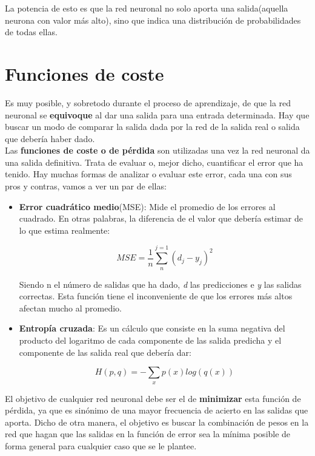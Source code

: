 \documentclass[11pt,fleqn]{book} %
\begin{document}
La potencia de esto es que la red neuronal no solo aporta una salida(aquella neurona con valor más alto), sino que indica una distribución de probabilidades de todas ellas. 

\section{Funciones de coste}\label{sec:funcioncoste} 

Es muy posible, y sobretodo durante el proceso de aprendizaje, de que la red neuronal se \textbf{equivoque} al dar una salida para una entrada determinada. Hay que buscar un modo de comparar la salida dada por la red de la salida real o salida que debería haber dado. \\

Las \textbf{funciones de coste o de pérdida} son utilizadas una vez la red neuronal da una salida definitiva. Trata de evaluar o, mejor dicho, cuantificar el error que ha tenido. Hay muchas formas de analizar o evaluar este error, cada una con sus pros y contras, vamos a ver un par de ellas:\\

\begin{itemize}
	\item \textbf{Error cuadrático medio}(MSE): Mide el promedio de los errores al cuadrado. En otras palabras, la diferencia de el valor que debería estimar de lo que estima realmente:
	
	\begin{equation*}
	MSE = \frac{1}{n} \sum_n^{j=1}{(d_j - y_j)^2}
	\end{equation*}
	
	Siendo n el número de salidas que ha dado, \textit{d} las predicciones e \textit{y} las salidas correctas. Esta función tiene el inconveniente de que los errores más altos afectan mucho al promedio. \\
	
	\item \textbf{Entropía cruzada}: Es un cálculo que consiste en la suma negativa del producto del logaritmo de cada componente de las salida predicha y el componente de las salida real que debería dar:
	
	\begin{equation*}
	H(p,q) = -\sum_x p(x)log(q(x))
	\end{equation*}
	
\end{itemize}

El objetivo de cualquier red neuronal debe ser el de \textbf{minimizar} esta función de pérdida, ya que es sinónimo de una mayor frecuencia de acierto en las salidas que aporta. Dicho de otra manera, el objetivo es buscar la combinación de pesos en la red que hagan que las salidas en la función de error sea la mínima posible de forma general para cualquier caso que se le plantee. \\ 
\end{document}
